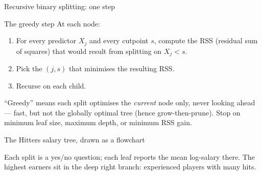 \documentclass[aspectratio=169,11pt]{beamer}
\begin{document}
\begin{frame}{Recursive binary splitting: one step}\label{frm:greedy}
  \begin{block}{The greedy step}
    At each node:
    \begin{enumerate}
      \item For every predictor $X_j$ and every cutpoint $s$, compute
            the RSS (residual sum of squares) that would result from splitting on $X_j < s$.
      \item Pick the $(j, s)$ that minimises the resulting RSS.
      \item Recurse on each child.
    \end{enumerate}
  \end{block}
  \begin{readme}
    ``Greedy'' means each split optimises the \emph{current} node only,
    never looking ahead --- fast, but not the globally optimal tree
    (hence grow-then-prune). Stop on minimum leaf size, maximum depth,
    or minimum RSS gain.
  \end{readme}
\end{frame}

\begin{frame}{The Hitters salary tree, drawn as a flowchart}
  \begin{center}
  \end{center}
  \begin{takeaway}Each split is a yes/no question; each leaf reports the mean log-salary there. The highest earners sit in the deep right branch: experienced players with many hits.\end{takeaway}
\end{frame}
\end{document}
